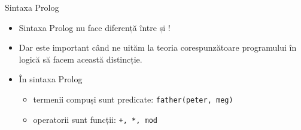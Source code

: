 \documentclass[xcolor=pdftex,romanian,colorlinks]{beamer}
\begin{document}




\begin{frame}{Sintaxa Prolog}

\begin{itemize}
  \item {Sintaxa Prolog nu face diferență între  și !}
  \vfill
  \item Dar este important când ne uităm la teoria corespunzătoare programului în logică să facem această distincție.
  \vfill
    \item \^{I}n sintaxa Prolog
    \begin{itemize}
    \item termenii compuși sunt predicate: \texttt{father(peter, meg)}
    \item operatorii sunt funcții: \texttt{+, *, mod}
    \end{itemize}
\end{itemize}
\end{frame}



\end{document}
